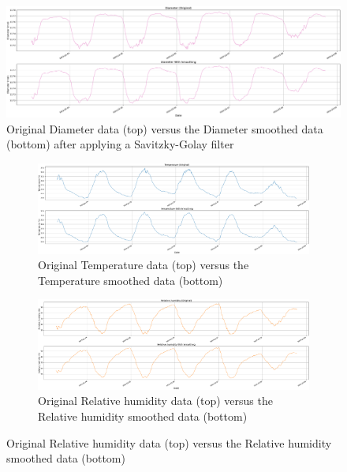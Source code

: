 \begin{figure}[htbp]
    \centering
    \includegraphics[width=15 cm]{5_ChapterDesign/figuras/2_Smoothing/Smoothing_Diameter}
    \caption{Original Diameter data (top) versus the Diameter smoothed data (bottom) after applying a Savitzky-Golay filter}
\end{figure}

\begin{figure}[htbp]
    \centering
    
    \begin{minipage}[b]{0.45\textwidth}
        \centering
        \begin{subfigure}{\textwidth}
            \centering
            \includegraphics[width=\textwidth]{5_ChapterDesign/figuras/2_Smoothing/Smoothing_Temperature}
            \caption{Original Temperature data (top) versus the Temperature smoothed data (bottom)}
            \label{fig:temperature}
        \end{subfigure}
    \end{minipage}
    \hfill
    \begin{minipage}[b]{0.45\textwidth}
        \centering
        \begin{subfigure}{\textwidth}
            \centering
            \includegraphics[width=\textwidth]{5_ChapterDesign/figuras/2_Smoothing/Smoothing_Relative_humidity}
            \caption{Original Relative humidity data (top) versus the Relative humidity smoothed data (bottom)}
            \label{fig:relative_humidity}
        \end{subfigure}
    \end{minipage}
    

\end{figure}

